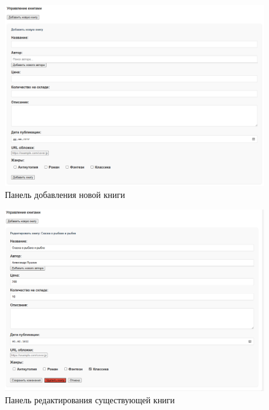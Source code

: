 \begin{figure}[H]
	\centering
	\includegraphics[width=0.9\linewidth]{images/добавление}
	\caption{Панель добавления новой книги}
	\label{fig:44}
\end{figure}

\begin{figure}[H]
	\centering
	\includegraphics[width=0.9\linewidth]{images/редактирование}
	\caption{Панель редактирования существующей книги}
	\label{fig:55}
\end{figure}

